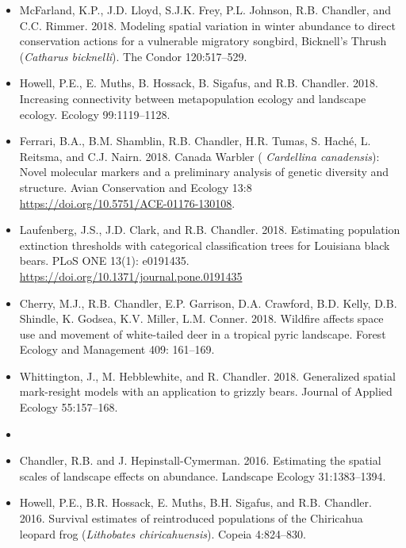 \begin{itemize}
\item McFarland, K.P., J.D. Lloyd, S.J.K. Frey, P.L. Johnson,
  R.B. Chandler, and C.C. Rimmer. 2018. Modeling spatial
  variation in winter abundance to direct conservation actions for a
  vulnerable migratory songbird, Bicknell’s Thrush ({\it Catharus
    bicknelli}). The Condor 120:517--529. 

\item Howell, P.E., E. Muths, B. Hossack, B. Sigafus, and
  R.B. Chandler. 2018. Increasing connectivity between 
  metapopulation ecology and landscape ecology. Ecology 99:1119--1128.  
  
\item Ferrari, B.A., B.M. Shamblin, R.B. Chandler, H.R. Tumas, S. Hach\'e,
  L. Reitsma, and C.J. Nairn. 2018. Canada Warbler ({\it
  Cardellina canadensis}): Novel molecular markers and a preliminary
  analysis of genetic diversity and structure. Avian Conservation and
  Ecology 13:8 \url{https://doi.org/10.5751/ACE-01176-130108}.

\item Laufenberg, J.S., J.D. Clark, and
  R.B. Chandler. 2018. Estimating population extinction thresholds 
  with categorical classification trees for Louisiana black
  bears. PLoS ONE 13(1): e0191435.
  \url{https://doi.org/10.1371/journal.pone.0191435}

\item Cherry, M.J., R.B. Chandler, E.P. Garrison, D.A. Crawford,
  B.D. Kelly, D.B. Shindle, K. Godsea, K.V. Miller,
  L.M. Conner. 2018. Wildfire affects space use and movement of
  white-tailed deer in a tropical pyric landscape. Forest Ecology and
  Management 409: 161--169. 

\item Whittington, J., M. Hebblewhite, and
  R. Chandler. 2018. Generalized spatial mark-resight models with an 
  application to grizzly bears. Journal of Applied Ecology
  55:157--168. 



\item[] { \\}

\item Chandler, R.B. and J. Hepinstall-Cymerman. 2016. Estimating
  the spatial scales of landscape effects on abundance. Landscape
  Ecology 31:1383--1394. 

\item Howell, P.E., B.R. Hossack, E. Muths, B.H. Sigafus, and
  R.B. Chandler. 2016. Survival estimates of reintroduced populations
  of the Chiricahua leopard frog ({\it Lithobates
    chiricahuensis}). Copeia 4:824--830.   


\end{itemize}
